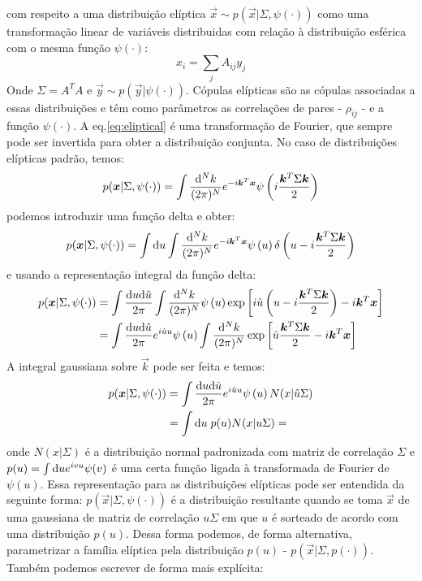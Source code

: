  com respeito a uma distribuição elíptica $\vec{x} \sim p(\vec{x} | \Sigma, \psi(\cdot))$ como uma transformação linear de variáveis distribuidas com relação à distribuição esférica com o mesma função $\psi(\cdot)$: 
\[
x_{i} = \sum_{j} A_{ij} y_{j} 
\]
Onde $\Sigma = A^{T}A$ e $\vec{y}\sim p(\vec{y}| \psi(\cdot))$. Cópulas elípticas são as cópulas associadas a essas distribuições e têm como parâmetros as correlações de pares - $\rho_{ij}$ - e a função $\psi(\cdot)$. A eq.\eqref{eq:eliptical} é uma transformação de Fourier, que sempre pode ser invertida para obter a distribuição conjunta. No caso de distribuições elípticas padrão, temos:
\[
p(\bm{x}| \Sigma, \psi(\cdot) )  = \int \frac{\mathrm{d}^N k}{(2\pi)^N} e^{-i\bm{k}^{T}\bm{x}} \psi\left(i\frac{\bm{k}^{T}\Sigma\bm{k}}{2}\right) 
\]
podemos introduzir uma função delta e obter:
\[
p(\bm{x}| \Sigma, \psi(\cdot) )  = \int \mathrm{d} u \int \frac{\mathrm{d}^N k}{(2\pi)^N} e^{-i\bm{k}^{T}\bm{x}} \psi\left(u\right) \delta\left(u - i\frac{\bm{k}^{T}\Sigma\bm{k}}{2}\right) 
\]
e usando a representação integral da função delta:
\begin{align*}
p(\bm{x}| \Sigma, \psi(\cdot) )  &= \int \frac{\mathrm{d} u \mathrm{d} \hat{u}}{2\pi} \int \frac{\mathrm{d}^N k}{(2\pi)^N}  \psi\left(u\right) \exp\left[i\hat{u}\left(u - i\frac{\bm{k}^{T}\Sigma\bm{k}}{2}\right)-i\bm{k}^{T}\bm{x}\right] \\
		     &= \int \frac{\mathrm{d} u \mathrm{d} \hat{u}}{2\pi} e^{i\hat{u}u}\psi\left(u\right) \int \frac{\mathrm{d}^N k}{(2\pi)^N}   \exp\left[\hat{u}\frac{\bm{k}^{T}\Sigma\bm{k}}{2}-i\bm{k}^{T}\bm{x}\right]
\end{align*}
A integral gaussiana sobre $\vec{k}$ pode ser feita e temos:
\begin{align*}
p(\bm{x}| \Sigma , \psi(\cdot))  &= \int \frac{\mathrm{d} u \mathrm{d} \hat{u}}{2\pi} e^{i\hat{u}u}\psi\left(u\right) N(x | \hat{u} \Sigma) \\
		     &= \int \mathrm{d} u \; p(u) N(x | u \Sigma)  = 
\end{align*}
onde $N(x|\Sigma)$ é a distribuição normal padronizada com matriz de correlação $\Sigma$ e $p(u) = \int \mathrm{d} u e^{ivu}\psi(v)$ é uma certa função ligada à transformada de Fourier de $\psi(u)$. Essa representação para as distribuições elípticas pode ser entendida da seguinte forma: $p(\vec{x} | \Sigma, \psi(\cdot))$ é a distribuição resultante quando se toma $\vec{x}$ de uma gaussiana de matriz de correlação $u\Sigma$ em que $u$ é sorteado de acordo com uma distribuição $p(u)$. Dessa forma podemos, de forma alternativa, parametrizar a família elíptica pela distribuição $p(u)$ - $p(\vec{x} | \Sigma, p(\cdot))$. Também podemos escrever de forma mais explícita:
